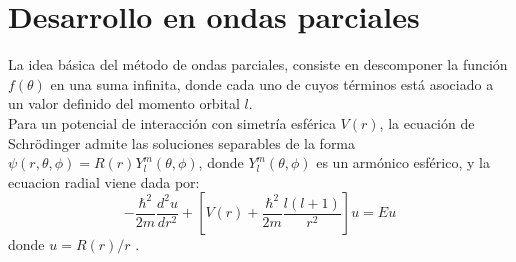 \section{Desarrollo en ondas parciales}\label{seccion2_3}
La idea b\'asica del m\'etodo de ondas parciales, consiste en
descomponer la funci\'on $f(\theta)$ en una suma infinita, donde cada uno de cuyos t\'erminos est\'a
asociado a un valor definido del momento orbital $l$.\\

Para un potencial de interacci\'on  con simetr\'ia esf\'erica $V(r)$, la ecuaci\'on de Schr\"odinger admite las soluciones separables de la forma $\psi(r,\theta,\phi)=R(r)Y^m_l(\theta,\phi)$, donde $Y^m_l(\theta,\phi)$ es un arm\'onico esf\'erico, y la ecuacion radial viene dada por:
\begin{equation}
-\frac{\hbar^2}{2m}\frac{d^2u}{dr^2}+\left[V(r)+\frac{\hbar^2}{2m}\frac{l(l+1)}{r^2}\right]u=Eu
\end{equation}
donde $u=R(r)/r$ \cite{griphys}.
